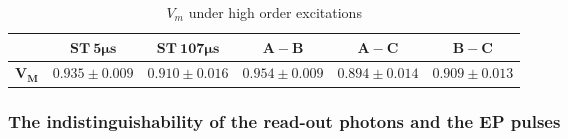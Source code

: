 \documentclass[aps,reprint,showpacs,superscriptaddress]{revtex4-2}
\begin{document}
\begin{table*}[!htbp]
	\caption{$V_m$ under high order excitations}
	\label{tab:high order excitations on V}
	\renewcommand\arraystretch{1.2}
	\begin{ruledtabular}
	\begin{tabular}{cccccc}
		& $\bm{ST\  5\mu s}$ &  $\bm{ST \ 107\mu s}$ & $\bm{A-B}$& $\bm{A-C}$ & $\bm{B-C}$\\
		\hline
		$\bm{V_M}$ &$0.935\pm0.009$&$0.910\pm 0.016$&$0.954\pm0.009$&$0.894\pm0.014$&$0.909\pm0.013$\\
	\end{tabular}
\end{ruledtabular}
\end{table*}

\subsubsection{The indistinguishability of the read-out photons and the EP pulses}
\end{document}
